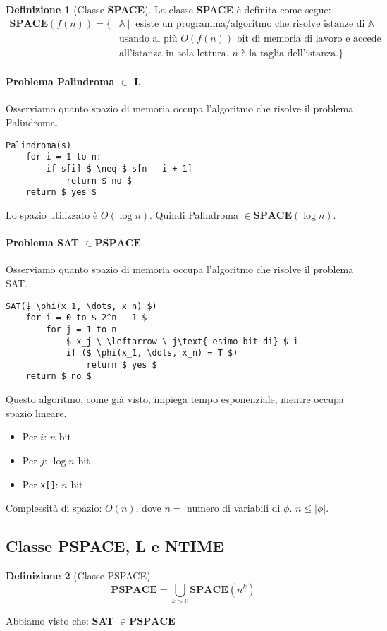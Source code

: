 \documentclass[a4paper]{article}
\theoremstyle{definition}
\newtheorem{definit}{Definizione}[subsection]
\newcommand{\Space}{\mathbf{SPACE}}
\newcommand{\pspace}{\mathbf{PSPACE}}
\newcommand{\prob}[1]{\mathbb{#1}}
\begin{document}
		\begin{definit}[Classe \textbf{SPACE}]
			La classe \textbf{SPACE} è definita come segue:
			\begin{align*}
				\Space(f(n)) = \big\lbrace & \prob{A}\ \Big|\ \text{ esiste un programma/algoritmo che risolve istanze di } \prob{A} \\ 
				&\text{usando al più } O(f(n)) \text{ bit di memoria di lavoro e accede }\\
				&\text{all'istanza in sola lettura. } n \text{ è la taglia dell'istanza}. \big\rbrace
			\end{align*}
		\end{definit}
		
		\paragraph{Problema Palindroma $ \in $ L} Osserviamo quanto spazio di memoria occupa l'algoritmo che risolve il problema Palindroma.
		\begin{lstlisting}[mathescape = true, frame = tb]
Palindroma(s)
	for i = 1 to n:
		if s[i] $ \neq $ s[n - i + 1]
			return $ no $
	return $ yes $
		\end{lstlisting}
		Lo spazio utilizzato è $ O(\log n) $. Quindi Palindroma $ \in \Space(\log n) $.
		
		\paragraph{Problema SAT $ \in \pspace $} Osserviamo quanto spazio di memoria occupa l'algoritmo che risolve il problema SAT.
		\begin{lstlisting}[mathescape = true, frame = tb]
SAT($ \phi(x_1, \dots, x_n) $)
	for i = 0 to $ 2^n - 1 $
		for j = 1 to n
			$ x_j \ \leftarrow \ j\text{-esimo bit di} $ i
			if ($ \phi(x_1, \dots, x_n) = T $)
				return $ yes $
	return $ no $
		\end{lstlisting}
		Questo algoritmo, come già visto, impiega tempo esponenziale, mentre occupa spazio lineare.
		\begin{itemize}
			\item Per $ i $: $ n $ bit
			\item Per $ j $: $ \log n $ bit
			\item Per \lstinline|x[]|: $ n $ bit
 		\end{itemize}
		Complessità di spazio: $ O(n) $, dove $ n = $ numero di variabili di $ \phi $. $ n \leq |\phi| $.
		
		\subsection{Classe PSPACE, L e NTIME}
			\begin{definit}[Classe PSPACE]
				\[
					\pspace = \bigcup\limits_{k > 0} \Space(n^k)
				\]
			\end{definit}
			Abbiamo visto che: \textbf{SAT} $ \in \pspace $
			
\end{document}
